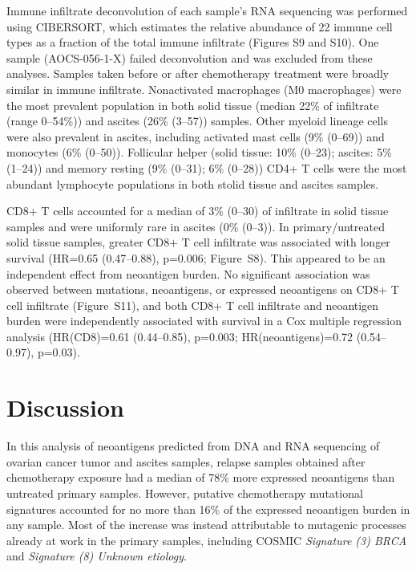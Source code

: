 \documentclass[linenumbers]{bmcart}
\begin{document}
Immune infiltrate deconvolution of each sample's RNA sequencing was performed using CIBERSORT, which estimates the relative abundance of 22 immune cell types as a fraction of the total immune infiltrate (Figures S9 and S10). One sample (AOCS-056-1-X) failed deconvolution and was excluded from these analyses. Samples taken before or after chemotherapy treatment were broadly similar in immune infiltrate. Nonactivated macrophages (M0 macrophages) were the most prevalent population in both solid tissue (median 22\% of infiltrate (range 0--54\%)) and ascites (26\% (3--57)) samples. Other myeloid lineage cells were also prevalent in ascites, including activated mast cells (9\% (0--69)) and monocytes (6\% (0--50)). Follicular helper (solid tissue: 10\% (0--23); ascites: 5\% (1--24)) and memory resting (9\% (0--31); 6\% (0--28)) CD4+ T cells were the most abundant lymphocyte populations in both stolid tissue and ascites samples.


CD8+ T cells accounted for a median of 3\% (0--30) of infiltrate in solid tissue samples and were uniformly rare in ascites (0\% (0--3)). In primary/untreated solid tissue samples, greater CD8+ T cell infiltrate was associated with longer survival (HR=0.65 (0.47--0.88), p=0.006; Figure~S8). This appeared to be an independent effect from neoantigen burden. No significant association was observed between mutations, neoantigens, or expressed neoantigens on CD8+ T cell infiltrate (Figure~S11), and both CD8+ T cell infiltrate and neoantigen burden were independently associated with survival in a Cox multiple regression analysis (HR(CD8)=0.61 (0.44--0.85), p=0.003; HR(neoantigens)=0.72 (0.54--0.97), p=0.03).

\section*{Discussion}
In this analysis of neoantigens predicted from DNA and RNA sequencing of ovarian cancer tumor and ascites samples, relapse samples obtained after chemotherapy exposure had a median of 78\% more expressed neoantigens than untreated primary samples. However, putative chemotherapy mutational signatures accounted for no more than 16\% of the expressed neoantigen burden in any sample. Most of the increase was instead attributable to mutagenic processes already at work in the primary samples, including COSMIC \textit{Signature (3) BRCA} and \textit{Signature (8) Unknown etiology}. 
\end{document}
